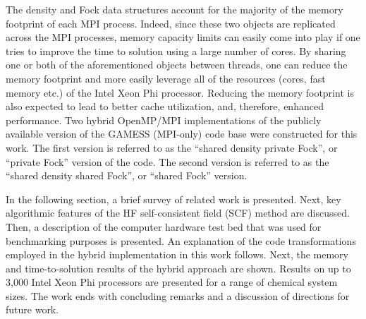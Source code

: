 The density and Fock data structures account for the majority of the memory footprint of each MPI process. Indeed, since these two objects are replicated across the MPI processes, memory capacity limits can easily come into play if one tries to improve the time to solution using a large number of cores. By sharing one or both of the aforementioned objects between threads, one can reduce the memory footprint and more easily leverage all of the resources (cores, fast memory etc.) of the Intel Xeon Phi processor. Reducing the memory footprint is also expected to lead to better cache utilization, and, therefore, enhanced performance. Two hybrid OpenMP/MPI implementations of the publicly available version of the GAMESS (MPI-only) code base were constructed for this work. The first version is referred to as the ``shared density private Fock'', or ``private Fock'' version of the code. The second version is referred to as the ``shared density shared Fock'', or ``shared Fock'' version.

In the following section, a brief survey of related work is presented. Next, key algorithmic features of the HF self-consistent field (SCF) method are discussed. Then, a description of the computer hardware test bed that was used for benchmarking purposes is presented. An explanation of the code transformations employed in the hybrid implementation in this work follows. Next, the memory and time-to-solution results of the hybrid approach are shown. Results on up to 3,000 Intel Xeon Phi processors are presented for a range of chemical system sizes. The work ends with concluding remarks and a discussion of directions for future work.
